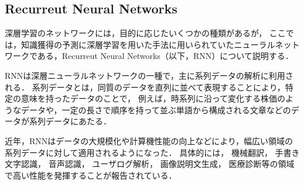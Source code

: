 
\subsection{Recurreut Neural Networks}
深層学習のネットワークには，目的に応じたいくつかの種類があるが，
ここでは，知識獲得の予測に深層学習を用いた手法\cite{piech2015deep}に用いられていたニューラルネットワークである，Recurreut Neural Networks\cite{williams1989learning}（以下，RNN）について説明する．


RNNは深層ニューラルネットワークの一種で，主に系列データの解析に利用される．
系列データとは，同質のデータを直列に並べて表現することにより，特定の意味を持ったデータのことで，
例えば，時系列に沿って変化する株価のようなデータや，一定の長さで順序を持って並ぶ単語から構成される文章などのデータが系列データにあたる．

近年，RNNはデータの大規模化や計算機性能の向上などにより，幅広い領域の系列データに対して適用されるようになった．
具体的には，
機械翻訳\cite{sutskever2014sequence, dong2015multi}，
手書き文字認識\cite{graves2009offline,louradour2014curriculum}，
音声認識\cite{hinton2012deep,bahdanau2015end}，
ユーザログ解析\cite{hidasi2015session}，
画像説明文生成\cite{xu2015show,vinyals2014show}，
医療診断\cite{choi2015doctor,lipton2015learning}等の領域で高い性能を発揮することが報告されている．

\begin{figure}[t]
\begin{center}
\hspace*{-40pt}
\end{center}
\end{figure}

